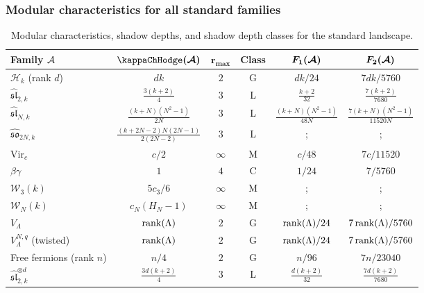 \subsubsection{Modular characteristics for all standard families}

\begin{table}[ht]
\centering
\caption{Modular characteristics, shadow depths, and shadow depth classes for the standard landscape.}
\renewcommand{\arraystretch}{1.4}
{\footnotesize
\begin{tabular}{|l|c|c|c|c|c|}
\hline
\textbf{Family $\mathcal{A}$} & $\boldsymbol{\kappaChHodge(\cA)}$ & $\boldsymbol{r_{\max}}$ & \textbf{Class} & $\boldsymbol{F_1(\mathcal{A})}$ & $\boldsymbol{F_2(\mathcal{A})}$ \\
\hline
$\mathcal{H}_k$ (rank $d$) & $dk$ & $2$ & G & $dk/24$ & $7dk/5760$ \\
\hline
$\widehat{\mathfrak{sl}}_{2,k}$ & $\frac{3(k+2)}{4}$ & $3$ & L & $\frac{k+2}{32}$ & $\frac{7(k+2)}{7680}$ \\
\hline
$\widehat{\mathfrak{sl}}_{N,k}$ & $\frac{(k+N)(N^2-1)}{2N}$ & $3$ & L & $\frac{(k+N)(N^2-1)}{48N}$ & $\frac{7(k+N)(N^2-1)}{11520N}$ \\
\hline
$\widehat{\mathfrak{so}}_{2N,k}$ & $\frac{(k+2N-2)N(2N-1)}{2(2N-2)}$ & $3$ & L &; &; \\
\hline
$\mathrm{Vir}_c$ & $c/2$ & $\infty$ & M & $c/48$ & $7c/11520$ \\
\hline
$\beta\gamma$ & $1$ & $4$ & C & $1/24$ & $7/5760$ \\
\hline
$\mathcal{W}_3(k)$ & $5c_3/6$ & $\infty$ & M &; &; \\
\hline
$\mathcal{W}_N(k)$ & $c_N(H_N - 1)$ & $\infty$ & M &; &; \\
\hline
$V_\Lambda$ & $\operatorname{rank}(\Lambda)$ & $2$ & G & $\operatorname{rank}(\Lambda)/24$ & $7\operatorname{rank}(\Lambda)/5760$ \\
\hline
$V_\Lambda^{N,q}$ (twisted) & $\operatorname{rank}(\Lambda)$ & $2$ & G & $\operatorname{rank}(\Lambda)/24$ & $7\operatorname{rank}(\Lambda)/5760$ \\
\hline
Free fermions (rank $n$) & $n/4$ & $2$ & G & $n/96$ & $7n/23040$ \\
\hline
$\widehat{\mathfrak{sl}}_{2,k}^{\otimes d}$ & $\frac{3d(k+2)}{4}$ & $3$ & L & $\frac{d(k+2)}{32}$ & $\frac{7d(k+2)}{7680}$ \\
\hline
\end{tabular}}
\end{table}

